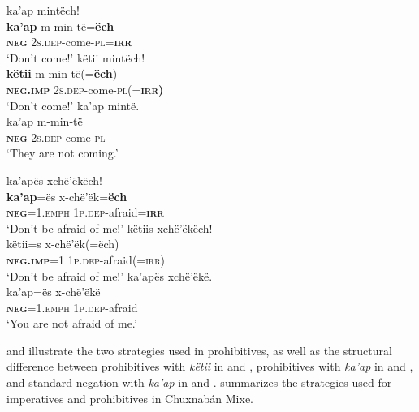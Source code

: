 \documentclass[output=paper,colorlinks,citecolor=brown,draft]{langscibook}
\begin{document}
\ea\label{ex:mix:32}
    \ea\label{ex:mix:32a}
        \glll ka’ap mintëch!\\ 
              \textbf{ka’ap} m-min-të=\textbf{ëch}\\
              \textbf{\textsc{neg}} \textsc{2s.dep}{}-come-\textsc{pl}=\textbf{\textsc{irr}}\\
        \glt ‘Don’t come!’ 
    \ex\label{ex:mix:32b}
        \glll këtii mintëch!\\
              \textbf{këtii} m-min-të(=\textbf{ëch}) \\
              \textbf{\textsc{neg.imp}} \textsc{2s.dep}{}-come-\textsc{pl}(=\textbf{\textsc{irr)}}\\
        \glt ‘Don’t come!’
    \ex\label{ex:mix:32c}
        \glll ka’ap mintë.\\
             ka’ap m-min-të \\
             \textbf{\textsc{neg}} \textsc{2s.dep}{}-come-\textsc{pl} \\
        \glt ‘They are not coming.’
    \z
\z 
 
\ea\label{ex:mix:33}
    \ea\label{ex:mix:33a}
        \glll ka’apës xchë’ëkëch! \\ 
              \textbf{ka’ap}=ës x-chë’ëk=\textbf{ëch}\\
              \textbf{\textsc{neg}}\textsc{=1.emph} \textsc{1p.dep}{}-afraid=\textbf{\textsc{irr}} \\
        \glt ‘Don’t be afraid of me!’
    \ex\label{ex:mix:33b}
        \glll këtiis xchë’ëkëch! \\
             këtii=s x-chë’ëk(=ëch)\\
             \textbf{\textsc{neg.imp}}\textsc{=1} \textsc{1p.dep}{}-afraid(=\textsc{irr)} \\
        \glt ‘Don’t be afraid of me!’
    \ex\label{ex:mix:33c}
        \glll ka’apës xchë’ëkë.\\
             ka’ap=ës x-chë’ëkë\\
             \textbf{\textsc{neg}}\textsc{=1.emph} \textsc{1p.dep}{}-afraid\\
        \glt ‘You are not afraid of me.’
    \z
\z 

 and  illustrate the two strategies used in prohibitives, as well as the structural difference between prohibitives with \textit{këtii} in  and , prohibitives with \textit{ka’ap} in  and , and standard negation with \textit{ka’ap} in  and .  summarizes the strategies used for imperatives and prohibitives in Chuxnabán Mixe.
\end{document}
